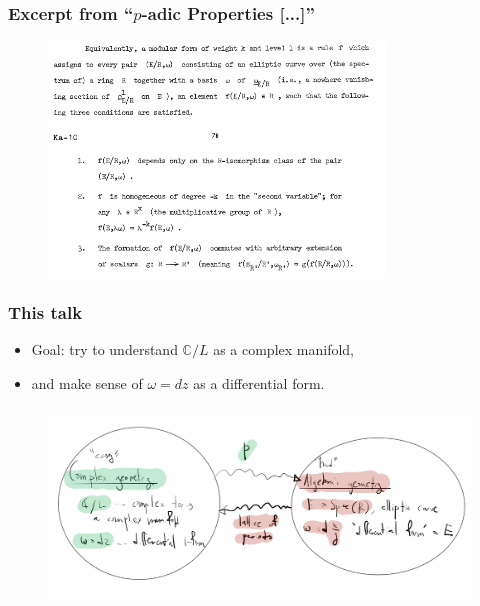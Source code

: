 \documentclass[usenames,dvipsnames]{beamer}
\theoremstyle{definition}
\begin{document}
\begin{frame}
  \frametitle{Excerpt from ``$p$-adic Properties [...]''}
  \begin{figure}[h]
    \centering
    \includegraphics[width=0.8\textwidth]{excerpt.png}
  \end{figure}
\end{frame}

\begin{frame}
  \frametitle{This talk}
  \begin{itemize}
    \item Goal: try to understand $\mathbb{C}/L$ as a complex manifold,\pause
    \item and make sense of $\omega=dz$ as a differential form.
  \end{itemize}
\end{frame}

\begin{frame}
  \frametitle{}
  \begin{figure}[h]
    \centering
    \includegraphics[width=1\textwidth]{bigpicture.png}
  \end{figure}
\end{frame}
\end{document}
